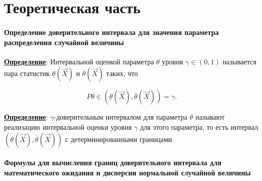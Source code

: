 \chapter{Теоретическая часть}

\subsubsection{Определение доверительного интервала для значения параметра распределения случайной величины}

\textbf{\underline{Определение}}: Интервальной оценкой параметра $\theta$ уровня $\gamma \in (0, 1)$ называется пара статистик $\underline\theta(\vec X)$ и $\overline\theta(\vec X)$ таких, что

\begin{equation}
    P {\theta \in (\underline\theta(\vec X), \overline\theta(\vec X))} = \gamma.
\end{equation}


\textbf{\underline{Определение}}: $\gamma$-доверительным интервалом для параметра $\theta$ называют реализацию интервальной оценки уровня $\gamma$ для этого параметра, то есть интервал $(\underline\theta(\vec X), \overline\theta(\vec X))$ с детерминированными границами.


\subsubsection{Формулы для вычисления границ доверительного интервала для математического ожидания и дисперсии нормальной случайной величины}

